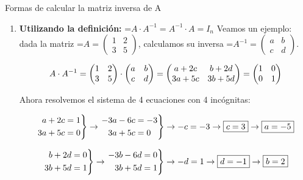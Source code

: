 \documentclass[11pt,a4paper]{article}
\newcommand{\fmm}[1]{\setbox0=\hbox{$#1$}\ifdim\wd0>\linewidth\fmdisp{#1}\else\mbox{\box0}\fi}
\newcommand{\fmdisp}[1]{\[\setbox2=\hbox{$\displaystyle #1$}\ifdim\wd2>\linewidth\resizebox{\linewidth}{!}{\box2}\else\box2\fi\]}
\begin{document}
\begin{fmex}{Formas de calcular la matriz inversa de A}
\begin{enumerate}[label=\textbf{\arabic*.},leftmargin=*]
\item \textbf{Utilizando la definición:} \fmm{A\cdot A^{-1}=A^{-1}\cdot A=I_n}\newline
          Veamos un ejemplo: dada la matriz \fmm{A=\begin{pmatrix}1 & 2\\ 3 & 5\end{pmatrix}}, calculamos su inversa \fmm{A^{-1}=\begin{pmatrix}a & b\\ c & d\end{pmatrix}}.

\fmdisp{A\cdot A^{-1}=\begin{pmatrix}1 & 2\\ 3 & 5\end{pmatrix}\cdot\begin{pmatrix}a & b\\ c & d\end{pmatrix}=\begin{pmatrix}a+2c & b+2d\\ 3a+5c & 3b+5d\end{pmatrix}=\begin{pmatrix}1 & 0\\ 0 & 1\end{pmatrix}}

Ahora resolvemos el sistema de 4 ecuaciones con 4 incógnitas:

\fmdisp{\left.\begin{aligned}a+2c&=1\\ 3a+5c&=0\end{aligned}\right\}\rightarrow\left.\begin{aligned}-3a-6c&=-3\\ 3a+5c&=0\end{aligned}\right\}\rightarrow-c=-3\rightarrow\boxed{c=3}\rightarrow\boxed{a=-5}}

\fmdisp{\left.\begin{aligned}b+2d&=0\\ 3b+5d&=1\end{aligned}\right\}\rightarrow\left.\begin{aligned}-3b-6d&=0\\ 3b+5d&=1\end{aligned}\right\}\rightarrow-d=1\rightarrow\boxed{d=-1}\rightarrow\boxed{b=2}}


\end{enumerate}
\end{fmex}
\end{document}
